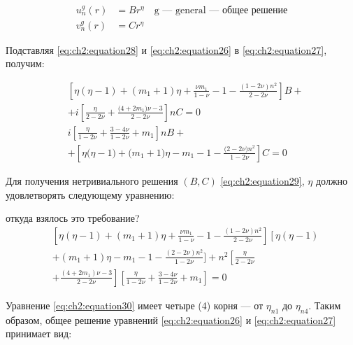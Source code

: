 \begin{equation}
\label{eq:ch2:equation28}
\begin{split}
	u_n^g(r) &= Br^{\eta} \quad \text{g --- general --- общее решение}\\
	v_n^g(r) &= Cr^{\eta}
\end{split}
\end{equation}

Подставляя \cref{eq:ch2:equation28} и \cref{eq:ch2:equation26} в \cref{eq:ch2:equation27}, получим:

\begin{equation}
\label{eq:ch2:equation29}
\begin{split}
	&\left [ \eta \left (\eta-1 \right) + \left (m_1 +1 \right) \eta + \frac{\nu m_1}{1-\nu} - 1 -\frac{ \left (1-2\nu \right)n^2}{2-2\nu} \right ] B+ \\
&+ i \left[\frac{\eta}{2-2\nu} + \frac{\big (4+2m_1 \big ) \nu -3 }{2-2\nu}  \right] n C=0
\\
&i \left [ \frac{\eta}{1-2\nu} + \frac{3-4\nu}{1-2\nu} + m_1 \right ] nB+\\
&+\left [ \eta \big ( \eta-1\big ) + \big (m_1 +1 \big )\eta - m_1 -1 - \frac{\big (2-2\nu \big ) n^2}{1-2\nu} \right ] C=0
\end{split}
\end{equation}

Для получения нетривиального решения \( (B, C) \) \cref{eq:ch2:equation29}, \( \eta \) должно удовлетворять следующему уравнению:

{\color{red} откуда взялось это требование?}
\begin{equation}
\label{eq:ch2:equation30}
\begin{split}
	& \left [\eta  \left (\eta -1 \right )+  \left ( m_1 +1 \right ) \eta + \frac{\nu m_1}{1-\nu} -1 - \frac{ \left (1 - 2\nu  \right  ) n^2}{2-2\nu} \right ]  \left [ \eta  \left (\eta -1 \right ) \right. \\
	&+ \left. \left  ( m_1 + 1 \right ) \eta - m_1 - 1 - \frac{ \left ( 2-2\nu  \right ) n^2}{1-2\nu}  \right. ] +n^2 \left [ \frac{\eta}{2-2\nu}  \right. \\
	&+  \left. \frac{  \left ( 4+2 m_1 \right ) \nu -3}{2-2\nu}  \right ] \left  [ \frac{\eta}{1-2\nu} + \frac{3-4\nu}{1-2\nu} +m_1 \right ] = 0
\end{split}
\end{equation}

Уравнение \cref{eq:ch2:equation30} имеет четыре (4) корня --- от \( \eta_{n1} \) до \( \eta_{n4} \). Таким образом, общее решение уравнений \cref{eq:ch2:equation26} и \cref{eq:ch2:equation27} принимает вид:

